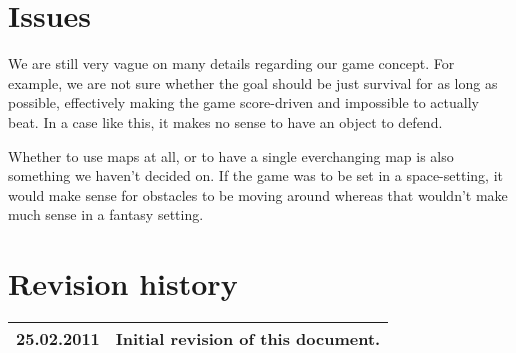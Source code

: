 \documentclass[titlepage,a4paper,11pt]{article}
\begin{document}
\section{Issues}
We are still very vague on many details regarding our game concept. For example,
we are not sure whether the goal should be just survival for as long as possible,
effectively making the game score-driven and impossible to actually beat. In a
case like this, it makes no sense to have an object to defend.

Whether to use maps at all, or to have a single everchanging map is also something
we haven't decided on. If the game was to be set in a space-setting, it would
make sense for obstacles to be moving around whereas that wouldn't make much sense
in a fantasy setting. 

\section{Revision history}

\begin{table}[H]
  \begin{tabular}{| c | c |}
    \hline
    25.02.2011 & Initial revision of this document. \\
    \hline
  \end{tabular}
\end{table}
\end{document}
